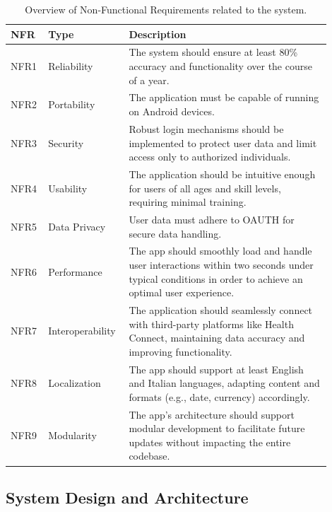 \begin{table}[h!]
    \setstretch{\myspacing}
    \centering
    \begin{tabular}{|>{\raggedright\arraybackslash}p{0.1\linewidth}|>{\raggedright\arraybackslash}p{0.2\linewidth}|>{\raggedright\arraybackslash}p{0.6\linewidth}|}
        \hline
        \textbf{NFR} & \textbf{Type} & \textbf{Description} \\
        \hline
        NFR1 & Reliability & The system should ensure at least 80\% accuracy and functionality over the course of a year. \\
        \hline
        NFR2 & Portability & The application must be capable of running on Android devices. \\
        \hline
        NFR3 & Security & Robust login mechanisms should be implemented to protect user data and limit access only to authorized individuals. \\
        \hline
        NFR4 & Usability & The application should be intuitive enough for users of all ages and skill levels, requiring minimal training. \\
        \hline
        NFR5 & Data Privacy & User data must adhere to OAUTH for secure data handling. \\
        \hline
        NFR6 & Performance & The app should smoothly load and handle user interactions within two seconds under typical conditions in order to achieve an optimal user experience. \\
        \hline
        NFR7 & Interoperability & The application should seamlessly connect with third-party platforms like Health Connect, maintaining data accuracy and improving functionality. \\
        \hline
        NFR8 & Localization & The app should support at least English and Italian languages, adapting content and formats (e.g., date, currency) accordingly. \\
        \hline
        NFR9 & Modularity & The app's architecture should support modular development to facilitate future updates without impacting the entire codebase. \\
        \hline
    \end{tabular}
    \caption{Overview of Non-Functional Requirements related to the system.}
    \label{tab:nfr}
\end{table}
\newpage
\subsection{System Design and Architecture}
